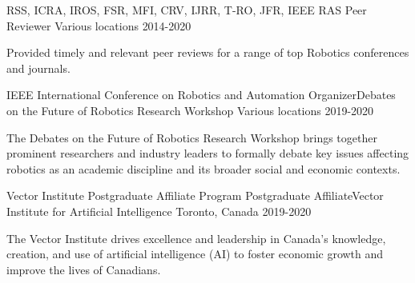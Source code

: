 

\begin{cventries} 

  \cventry
    {RSS, ICRA, IROS, FSR, MFI, CRV, IJRR, T-RO, JFR, IEEE RAS} %
    {Peer Reviewer} %
    {Various locations} %
    {2014-2020} %
    {
      \begin{cvitems} %
        \item {Provided timely and relevant peer reviews for a range of top Robotics conferences and journals.}
      \end{cvitems}
    }
    
  \cventry
    {IEEE International Conference on Robotics and Automation} %
    {Organizer{\awesomesep}Debates on the Future of Robotics Research Workshop} %
    {Various locations} %
    {2019-2020} %
    {
      \begin{cvitems} %
        \item {The Debates on the Future of Robotics Research Workshop brings together prominent researchers and industry leaders to formally debate key issues affecting robotics as an academic discipline and its broader social and economic contexts.}
      \end{cvitems}
    }
    
  \cventry
    {Vector Institute Postgraduate Affiliate Program} %
    {Postgraduate Affiliate{\awesomesep}Vector Institute for Artificial Intelligence} %
    {Toronto, Canada} %
    {2019-2020} %
    {
      \begin{cvitems} %
        \item {The Vector Institute drives excellence and leadership in Canada’s knowledge, creation, and use of artificial intelligence (AI) to foster economic growth and improve the lives of Canadians.}
      \end{cvitems}
    }
    

\end{cventries}
